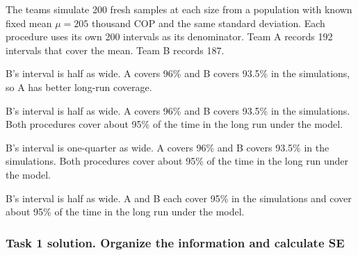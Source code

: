 The teams simulate 200 fresh samples at each size from a population with known fixed mean $\mu=205$ thousand COP and the same standard deviation. Each procedure uses its own 200 intervals as its denominator. Team A records 192 intervals that cover the mean. Team B records 187.


\begin{answeroptions}
    \item B's interval is half as wide. A covers 96\% and B covers 93.5\% in the simulations, so A has better long-run coverage.
    \item B's interval is half as wide. A covers 96\% and B covers 93.5\% in the simulations. Both procedures cover about 95\% of the time in the long run under the model.
    \item B's interval is one-quarter as wide. A covers 96\% and B covers 93.5\% in the simulations. Both procedures cover about 95\% of the time in the long run under the model.
    \item B's interval is half as wide. A and B each cover 95\% in the simulations and cover about 95\% of the time in the long run under the model.
\end{answeroptions}

\clearpage
\subsubsection*{Task 1 solution. Organize the information and calculate SE}
\label{sol:c2-5-a}

